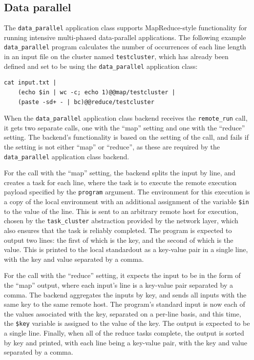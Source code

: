 \documentclass[oneside]{report}
\begin{document}
\subsection{Data parallel}

The \texttt{data\_parallel} application class supports MapReduce-style functionality for running intensive multi-phased data-parallel applications.
The following example \texttt{data\_parallel} program calculates the number of occurrences of each line length in an input file on the cluster named \texttt{testcluster}, which has already been defined and set to be using the \texttt{data\_parallel} application class:

\begin{minipage}[c]{\textwidth-15pt}
  \begin{lstlisting}[language=shard]
cat input.txt |
    (echo $in | wc -c; echo 1)@@map/testcluster |
    (paste -sd+ - | bc)@@reduce/testcluster
\end{lstlisting}
  \smallskip
\end{minipage}

When the \texttt{data\_parallel} application class backend receives the \texttt{remote\_run} call, it gets two separate calls, one with the ``map'' setting and one with the ``reduce'' setting.
The backend's functionality is based on the setting of the call, and fails if the setting is not either ``map'' or ``reduce'', as these are required by the \texttt{data\_parallel} application class backend.

For the call with the ``map'' setting, the backend splits the input by line, and creates a task for each line, where the task is to execute the remote execution payload specified by the \texttt{program} argument.
The environment for this execution is a copy of the local environment with an additional assignment of the variable \texttt{\$in} to the value of the line.
This is sent to an arbitrary remote host for execution, chosen by the \texttt{task\_cluster} abstraction provided by the network layer, which also ensures that the task is reliably completed.
The program is expected to output two lines: the first of which is the key, and the second of which is the value.
This is printed to the local standardout as a key-value pair in a single line, with the key and value separated by a comma.

For the call with the ``reduce'' setting, it expects the input to be in the form of the ``map'' output, where each input's line is a key-value pair separated by a comma.
The backend aggregates the inputs by key, and sends all inputs with the same key to the same remote host.
The program's standard input is now each of the values associated with the key, separated on a per-line basis, and this time, the \texttt{\$key} variable is assigned to the value of the key.
The output is expected to be a single line.
Finally, when all of the reduce tasks complete, the output is sorted by key and printed, with each line being a key-value pair, with the key and value separated by a comma.
\end{document}
